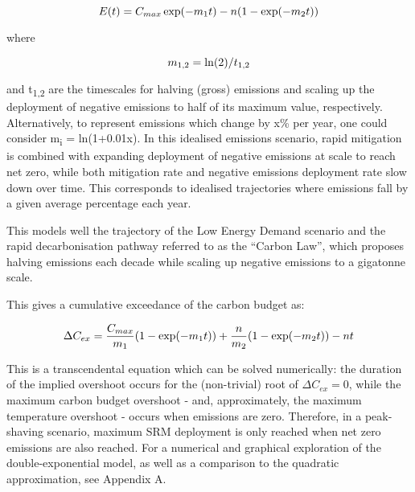 \documentclass[draft]{agujournal2019}
\begin{document}
\begin{equation}
E(t) =  C_{max} \exp(-  m\textsubscript{1} t) - n ( 1 - \exp( - m\textsubscript{2} t)) 
\end{equation}


where


\begin{equation}
m\textsubscript{1,2} = \ln(2)/t\textsubscript{1,2} 
\end{equation}


and t\textsubscript{1,2} are the timescales for halving (gross) emissions and scaling up the deployment of negative emissions to half of its maximum value, respectively. Alternatively, to represent emissions which change by x\% per year, one could consider m\textsubscript{i} = ln(1+0.01x). In this idealised emissions scenario, rapid mitigation is combined with expanding deployment of negative emissions at scale to reach net zero, while both mitigation rate and negative emissions deployment rate slow down over time. This corresponds to idealised trajectories where emissions fall by a given average percentage each year. 

\medskip

This models well the trajectory of the Low Energy Demand scenario \cite{grubler2018low} and the rapid decarbonisation pathway referred to as the ``Carbon Law'', which proposes halving emissions each decade while scaling up negative emissions to a gigatonne scale. \cite{Rockstrom1269}

\medskip

This gives a cumulative exceedance of the carbon budget as:


\begin{equation} \Delta C_{ex} = \frac{C_{max}}{m\textsubscript{1}} ( 1 - \exp( - m\textsubscript{1} t)) + \frac{n}{m\textsubscript{2}} ( 1 - \exp( - m
\textsubscript{2} t)) - nt 
\end{equation}


This is a transcendental equation which can be solved numerically: the duration of the implied overshoot occurs for the (non-trivial) root of $ \Delta C_{ex} = 0 $, while the maximum carbon budget overshoot - and, approximately, the maximum temperature overshoot - occurs when emissions are zero. Therefore, in a peak-shaving scenario, maximum SRM deployment is only reached when net zero emissions are also reached. For a numerical and graphical exploration of the double-exponential model, as well as a comparison to the quadratic approximation, see Appendix A. 
\end{document}
